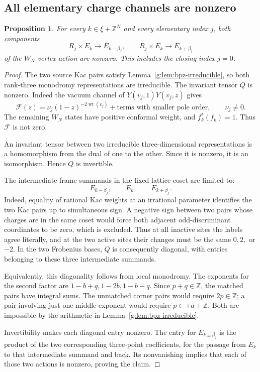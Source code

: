 \documentclass[11pt,a4paper]{article}
\numberwithin{equation}{section}
\newtheorem{proposition}[theorem]{Proposition}
\theoremstyle{definition}\newtheorem{definition}[theorem]{Definition}
\theoremstyle{remark}\newtheorem{remark}[theorem]{Remark}
\begin{document}
\subsection{All elementary charge channels are nonzero}
\begin{proposition}
\label{g:prop:all-periodic-channels}
For every $k\in\xi+\mathbb Z^N$ and every elementary index $j$,
both components
\[
 R_j\times E_k\longrightarrow E_{k-\beta_j},\qquad
 R_j\times E_k\longrightarrow E_{k+\beta_j}
\]
of the $W_N$ vertex action are nonzero. This includes the closing
index $j=0$.
\end{proposition}
\begin{proof}
The two source Kac pairs satisfy Lemma~\ref{g:lem:bpz-irreducible},
so both rank-three monodromy representations are irreducible.
The invariant tensor $Q$ is nonzero. Indeed the vacuum channel of
$Y(v_j,1)Y(v_j,z)$ gives
\[
 \mathcal F(z)=\nu_j(1-z)^{-2\operatorname{wt}(v_j)}
                 +\text{terms with smaller pole order},
 \qquad \nu_j\ne0.
\]
The remaining $W_N$ states have positive conformal weight, and
$f_k^*(f_k)=1$. Thus $\mathcal F$ is not zero.

An invariant tensor between two irreducible three-dimensional
representations is a homomorphism from the dual of one to the other.
Since it is nonzero, it is an isomorphism. Hence $Q$ is invertible.

The intermediate frame summands in the fixed lattice coset are limited to:
\[
 E_{k-\beta_j},\qquad E_k,\qquad E_{k+\beta_j}.
\]
Indeed, equality of
rational Kac weights at an irrational parameter identifies the two
Kac pairs up to simultaneous sign.
A negative sign between two pairs whose charges are in the same
coset would force both adjacent odd-discriminant coordinates to be
zero, which is excluded. Thus at all inactive sites the labels agree
literally, and at the two active sites their changes must be the same
$0,2,$ or $-2$. In the two Frobenius bases, $Q$ is consequently
diagonal, with entries belonging to these three intermediate summands.

Equivalently, this diagonality follows from local monodromy. The
exponents for the second factor are $1-b+q,1-2b,1-b-q$.
Since $p+q\in\mathbb Z$, the matched pairs have integral sums.
The unmatched corner pairs would require $2p\in\mathbb Z$;
a pair involving just one middle exponent would require
$p\in\pm a+\mathbb Z$. Both are impossible by the arithmetic in
Lemma~\ref{g:lem:bpz-irreducible}.

Invertibility makes each diagonal entry nonzero. The entry for
$E_{k\pm\beta_j}$ is the product of the two corresponding
three-point coefficients, for the passage from $E_k$ to that
intermediate summand and back. Its nonvanishing implies that each
of those two actions is nonzero, proving the claim.
\end{proof}
\end{document}
